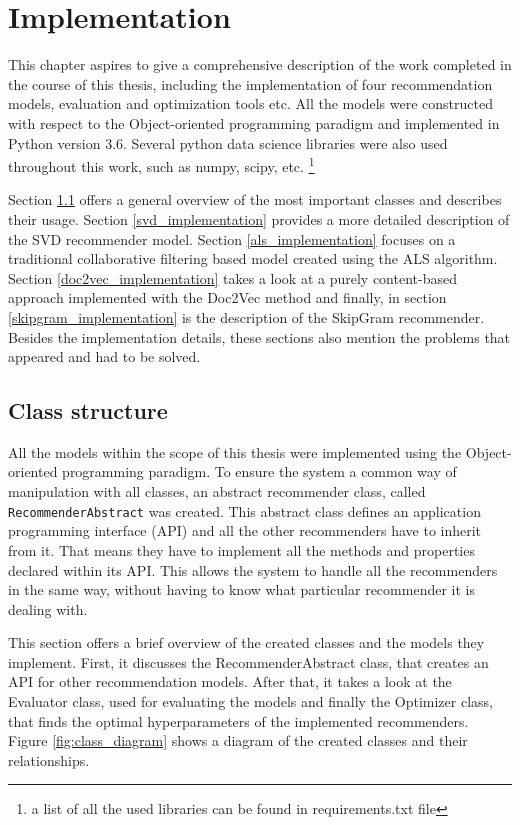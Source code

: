 \chapter{Implementation} \label{implementation}
This chapter aspires to give a comprehensive description of the work completed in the course of this thesis, including the implementation of four recommendation models, evaluation and optimization tools etc. All the models were constructed with respect to the Object-oriented programming paradigm and implemented in Python version 3.6. Several python data science libraries were also used throughout this work, such as numpy, scipy, etc. \footnote{a list of all the used libraries can be found in requirements.txt file}

Section \ref{class_model} offers a general overview of the most important classes and describes their usage. Section \ref{svd_implementation} provides a more detailed description of the SVD recommender model. Section \ref{als_implementation} focuses on a traditional collaborative filtering based model created using the ALS algorithm. Section \ref{doc2vec_implementation} takes a look at a purely content-based approach implemented with the Doc2Vec method and finally, in section \ref{skipgram_implementation} is the description of the SkipGram recommender. Besides the implementation details, these sections also mention the problems that appeared and had to be solved.

\section{Class structure} \label{class_model}
All the models within the scope of this thesis were implemented using the Object-oriented programming paradigm. To ensure the system a common way of manipulation with all classes, an abstract recommender class, called \texttt{RecommenderAbstract} was created. This abstract class defines an application programming interface (API) and all the other recommenders have to inherit from it. That means they have to implement all the methods and properties declared within its API. This allows the system to handle all the recommenders in the same way, without having to know what particular recommender it is dealing with.

This section offers a brief overview of the created classes and the models they implement. First, it discusses the RecommenderAbstract class, that creates an API for other recommendation models. After that, it takes a look at the Evaluator class, used for evaluating the models and finally the Optimizer class, that finds the optimal hyperparameters of the implemented recommenders. Figure \ref{fig:class_diagram} shows a diagram of the created classes and their relationships. 


